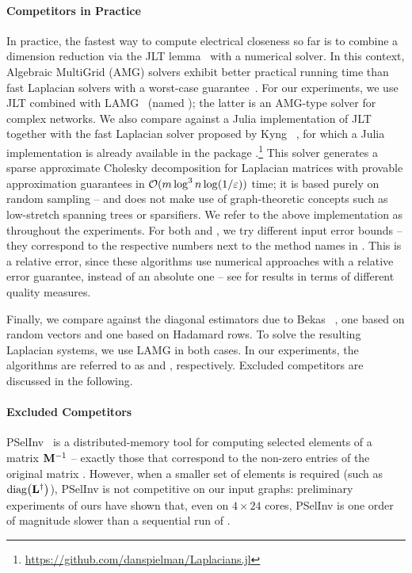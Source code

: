 \paragraph{Competitors in Practice}
In practice, the fastest way to compute electrical closeness so far is to combine
a dimension reduction via the JLT lemma~\cite{johnson1984extensions} with
a numerical solver. In this context, Algebraic MultiGrid (AMG) solvers
exhibit better practical running time than fast Laplacian solvers with a worst-case
guarantee~\cite{DBLP:conf/www/MavroforakisGKT15}.
For our experiments, we use JLT combined with LAMG~\cite{DBLP:journals/ppl/LumsdaineGHB07}
(named \lamgjlt); the latter is an AMG-type solver for complex networks. We also compare
against a Julia implementation of JLT together with the fast Laplacian solver proposed
by Kyng \etal~\cite{DBLP:conf/www/0002PSYZ19}, for which a Julia implementation is already
available in the package .\footnote{\url{https://github.com/danspielman/Laplacians.jl}}
This solver generates a sparse approximate Cholesky decomposition for Laplacian matrices
with provable approximation guarantees in $\mathcal{O}(m\log^3n\log(1/\varepsilon))$ time; it is based purely
on random sampling -- and does not make use of graph-theoretic concepts such as low-stretch
spanning trees or sparsifiers.
We refer to the above implementation as \juliajlt throughout the experiments.
For both \lamgjlt and \juliajlt, we try different input error bounds -- they correspond to the
respective numbers next to the method names in .
This is a relative error, since these algorithms use numerical approaches with a relative
error guarantee, instead of an absolute one -- see 
for results in terms of different quality measures.

Finally, we compare against the diagonal estimators due to Bekas \etal~\cite{bekas2007estimator},
one based on random vectors and one based on Hadamard rows. To solve the resulting Laplacian
systems, we use LAMG in both cases. In our experiments, the algorithms are referred to as
\bekas and \bekash, respectively. Excluded competitors are discussed in the following.

\paragraph{Excluded Competitors}
PSelInv~\cite{DBLP:journals/pc/Jacquelin0018} is a distributed-memory tool for computing
selected elements of a matrix $\mathbf{M}^{-1}$ -- exactly those that correspond to the non-zero entries
of the original matrix . However, when a smaller set of elements is required
(such as $\diag{\Linv}$), PSelInv is not competitive on our input graphs: preliminary experiments
of ours have shown that, even on $4\times 24$ cores, PSelInv is one order of magnitude slower
than a sequential run of \ust.

